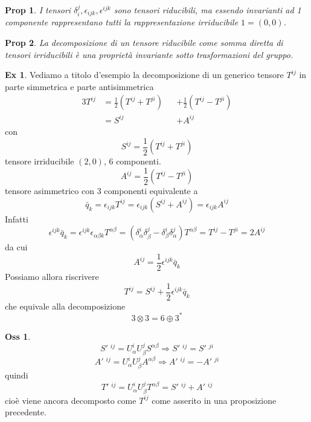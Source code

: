 \documentclass[10pt,a4paper]{article}
\newtheorem{prop}{Prop}[section]
\theoremstyle{definition}
\newtheorem{observation}{Oss}[section]
\newtheorem{example}{Ex}[section]
\begin{document}
\begin{prop}
    I tensori \(\delta_i^j, \epsilon_{ijk}, \epsilon^{ijk}\) sono tensori riducibili, ma essendo invarianti ad 1 componente rappresentano tutti la rappresentazione irriducibile $1 = (0, 0)$.
\end{prop}

\begin{prop}
    La decomposizione di un tensore riducibile come somma diretta di tensori irriducibili è una proprietà invariante sotto trasformazioni del gruppo.
\end{prop}

\begin{example}
    Vediamo a titolo d'esempio la decomposizione di un generico tensore $T^{ij}$ in parte simmetrica e parte antisimmetrica
    \begin{alignat*}{3}
        T^{ij} &= \frac12(T^{ij} + T^{ji}) &&+ \frac12 (T^{ij} - T^{ji}) \\
                &= S^{ij} &&+ A^{ij}      
    \end{alignat*}
    con
    \[
    S^{ij} =  \frac12(T^{ij} + T^{ji})   
    \]
    tensore irriducibile $(2, 0)$, 6 componenti.
    \[
    A^{ij} = \frac12 (T^{ij} - T^{ji}) 
    \]
    tensore asimmetrico con 3 componenti equivalente a 
    \[
    \bar{q}_k = \epsilon_{ijk} T^{ij} = \epsilon_{ijk} (S^{ij} + A^{ij}) = \epsilon_{ijk} A^{ij}    
    \]
    Infatti
    \[
    \epsilon^{ijk} \bar{q}_k = \epsilon^{ijk} \epsilon_{\alpha \beta k} T^{\alpha \beta} = (\delta_\alpha^i \delta_\beta^j - \delta_\beta^i \delta_\alpha^j)T^{\alpha \beta} = T^{ij} - T^{ji} = 2 A^{ij}     
    \]
    da cui
    \[
    A^{ij} = \frac12 \epsilon^{ijk} \bar{q}_k    
    \]
    Possiamo allora riscrivere 
    \[
    T^{ij} = S^{ij} + \frac12 \epsilon^{ijk}\bar{q}_k    
    \]
    che equivale alla decomposizione
    \[
    3 \otimes 3 = 6 \oplus 3^*    
    \]
\end{example}

\begin{observation}
    \[
    S'\phantom{.}^{ij} = U^i_\alpha U^j_\beta S^{\alpha \beta} \Rightarrow  S'\phantom{.}^{ij} = S'\phantom{.}^{ji}   
    \]
    \[
    A'\phantom{.}^{ij} = U^i_\alpha U^j_\beta A^{\alpha \beta} \Rightarrow  A'\phantom{.}^{ij} = -A'\phantom{.}^{ji}   
    \]
    quindi
    \[
    T'\phantom{.}^{ij} = U^i_\alpha U^j_\beta T^{\alpha \beta} = S'\phantom{.}^{ij} + A'\phantom{.}^{ij}   
    \]
    cioè viene ancora decomposto come $T^{ij}$ come asserito in una proposizione precedente.
\end{observation}
\end{document}

